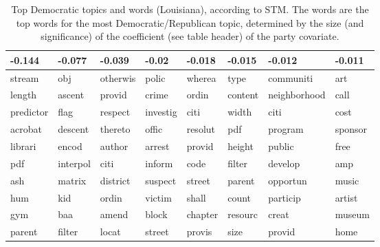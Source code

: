 \begin{table}[ht]
\centering
\begin{tabular}{llllllll}
  \hline
-0.144 & -0.077 & -0.039 & -0.02 & -0.018 & -0.015 & -0.012 & -0.011 \\ 
  \hline
stream & obj & otherwis & polic & wherea & type & communiti & art \\ 
  length & ascent & provid & crime & ordin & content & neighborhood & call \\ 
  predictor & flag & respect & investig & citi & width & citi & cost \\ 
  acrobat & descent & thereto & offic & resolut & pdf & program & sponsor \\ 
  librari & encod & author & arrest & provid & height & public & free \\ 
  pdf & interpol & citi & inform & code & filter & develop & amp \\ 
  ash & matrix & district & suspect & street & parent & opportun & music \\ 
  hum & kid & ordin & victim & shall & count & particip & artist \\ 
  gym & baa & amend & block & chapter & resourc & creat & museum \\ 
  parent & filter & locat & street & provis & size & provid & home \\ 
   \hline
\end{tabular}
\caption{Top Democratic topics and words (Louisiana), according to STM. 
             The words are the top words for the most Democratic/Republican topic, determined
             by the size (and significance) of the coefficient (see table header) of the party covariate.} 
\label{tabSTMLADem}
\end{table}

